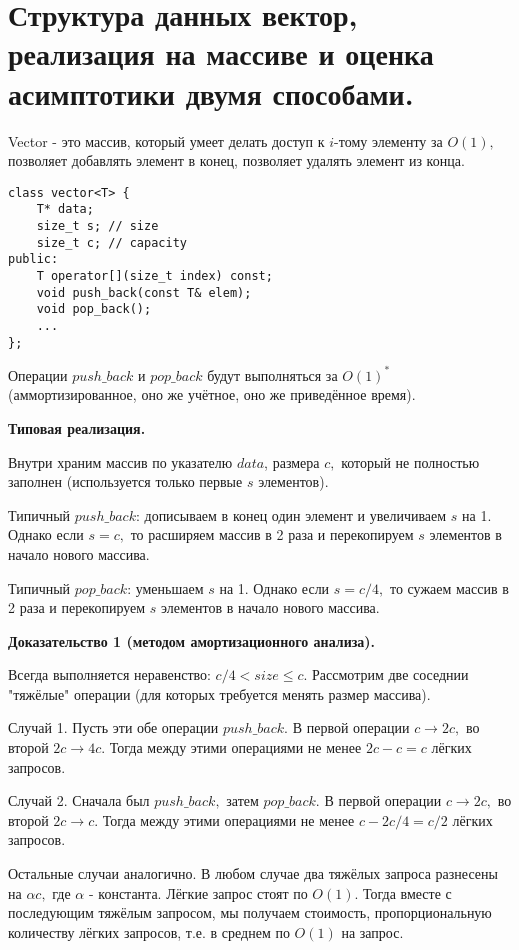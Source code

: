 \setcounter{section}{33}
\section{Структура данных вектор, реализация на массиве и оценка асимптотики двумя способами.}

Vector - это массив, который умеет делать доступ к $i$-тому элементу за $O(1),$ позволяет добавлять элемент в конец, позволяет удалять элемент из конца.
\begin{lstlisting}
class vector<T> {
    T* data;
    size_t s; // size
    size_t c; // capacity
public:
    T operator[](size_t index) const;
    void push_back(const T& elem);
    void pop_back();
    ...
};
\end{lstlisting}
Операции $push\_back$ и $pop\_back$ будут выполняться за $O(1)^*$ (аммортизированное, оно же учётное, оно же приведённое время).

\textbf{Типовая реализация.}

Внутри храним массив по указателю $data$, размера $c,$ который не полностью заполнен (используется только первые $s$ элементов).

Типичный $push\_back$: дописываем в конец один элемент и увеличиваем $s$ на 1. Однако если $s = c,$ то расширяем массив в 2 раза и перекопируем $s$ элементов в начало нового массива.

Типичный $pop\_back$: уменьшаем $s$ на 1. Однако если $s = c/4,$ то сужаем массив в 2 раза и перекопируем $s$ элементов в начало нового массива.

\textbf{Доказательство 1 (методом амортизационного анализа).}

Всегда выполняется неравенство: $c/4 < size \leq c.$
Рассмотрим две соседнии "тяжёлые" операции (для которых требуется менять размер массива).

Случай 1. Пусть эти обе операции $push\_back.$ В первой операции $c\to 2c,$ во второй $2c\to 4c.$ Тогда между этими операциями не менее $2c-c=c$ лёгких запросов.

Случай 2. Сначала был $push\_back,$ затем $pop\_back.$ В первой операции $c\to 2c,$ во второй $2c\to c.$ Тогда между этими операциями не менее $c-2c/4=c/2$ лёгких запросов.

Остальные случаи аналогично. В любом случае два тяжёлых запроса разнесены на $\alpha c,$ где $\alpha$ - константа. Лёгкие запрос стоят по $O(1)$. Тогда вместе с последующим тяжёлым запросом, мы получаем стоимость, пропорциональную количеству лёгких запросов, т.е. в среднем по $O(1)$ на запрос.

